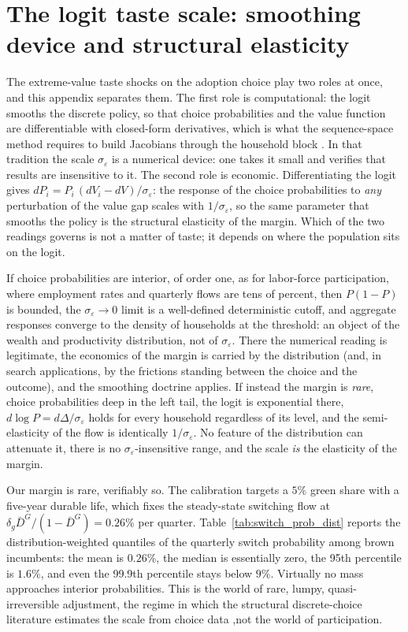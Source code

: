 \section{The logit taste scale: smoothing device and structural elasticity}
\label{app:taste}

The extreme-value taste shocks on the adoption choice play two roles at once, and
this appendix separates them. The first role is computational: the logit smooths
the discrete policy, so that choice probabilities and the value function are
differentiable with closed-form derivatives, which is what the sequence-space
method requires to build Jacobians through the household block
\citep{DCEGM2017}. In that tradition the scale $\sigma_\varepsilon$ is a
numerical device: one takes it small and verifies that results are insensitive to
it. The second role is economic. Differentiating the logit gives
$dP_i = P_i\,(dV_i - dV)/\sigma_\varepsilon$: the response of the choice
probabilities to \emph{any} perturbation of the value gap scales with
$1/\sigma_\varepsilon$, so the same parameter that smooths the policy is the
structural elasticity of the margin. Which of the two readings governs is not a
matter of taste; it depends on where the population sits on the logit.

If choice probabilities are interior, of order one, as for labor-force
participation, where employment rates and quarterly flows are tens of
percent, then $P(1-P)$ is bounded, the $\sigma_\varepsilon \to 0$ limit is a
well-defined deterministic cutoff, and aggregate responses converge to the
density of households at the threshold: an object of the wealth and productivity
distribution, not of $\sigma_\varepsilon$. There the numerical reading is
legitimate, the economics of the margin is carried by the distribution (and, in
search applications, by the frictions standing between the choice and the
outcome), and the smoothing doctrine applies. If instead the margin is
\emph{rare}, choice probabilities deep in the left tail, the logit is
exponential there, $d\log P = d\Delta/\sigma_\varepsilon$ holds for every
household regardless of its level, and the semi-elasticity of the flow is
identically $1/\sigma_\varepsilon$. No feature of the distribution can attenuate
it, there is no $\sigma_\varepsilon$-insensitive range, and the scale \emph{is}
the elasticity of the margin.

Our margin is rare, verifiably so. The calibration targets a $5\%$ green share
with a five-year durable life, which fixes the steady-state switching flow at
$\delta_g \bar D^{G}/(1-\bar D^{G}) = 0.26\%$ per quarter.
Table~\ref{tab:switch_prob_dist} reports the distribution-weighted quantiles of
the quarterly switch probability among brown incumbents: the mean is $0.26\%$,
the median is essentially zero, the 95th percentile is $1.6\%$, and even the
99.9th percentile stays below $9\%$. Virtually no mass approaches interior
probabilities. This is the world of rare, lumpy, quasi-irreversible
adjustment, the regime in which the structural discrete-choice literature
estimates the scale from choice data \citep{Rust1987},not the world of
participation.

